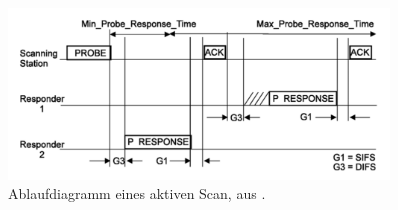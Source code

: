 \begin{figure}[h]
  \centering
	\includegraphics[width=0.9\textwidth]{images/activescan.png}
  \caption{Ablaufdiagramm eines aktiven Scan, aus \cite{ieee2012active}.}
  \label{fig:activescan}
\end{figure}







